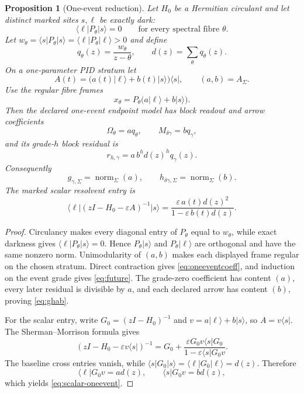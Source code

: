 \documentclass[11pt]{article}
\newtheorem{proposition}{Proposition}[section]
\theoremstyle{definition}
\theoremstyle{remark}
\newcommand{\eps}{\varepsilon}
\newcommand{\ket}[1]{\lvert #1\rangle}
\newcommand{\bra}[1]{\langle #1\rvert}
\begin{document}
\begin{proposition}[One-event reduction]\label{prop:oneevent}
Let $H_0$ be a Hermitian circulant and let distinct marked sites $s,\ell$ be exactly dark:
\[
\bra\ell P_\theta\ket s=0
\qquad\text{for every spectral fibre }\theta.
\]
Let $w_\theta=\bra sP_\theta\ket s=\bra\ell P_\theta\ket\ell>0$ and define
\[
q_\theta(z)=\frac{w_\theta}{z-\theta},
\qquad
d(z)=\sum_\theta q_\theta(z).
\]
On a one-parameter PID stratum let
\begin{equation}\label{eq:Aab}
A(t)=\bigl(a(t)\ket\ell+b(t)\ket s\bigr)\bra s,
\qquad (a,b)=A_\Sigma.
\end{equation}
Use the regular fibre frames
\[
x_\theta=P_\theta\bigl(a\ket\ell+b\ket s\bigr).
\]
Then the declared one-event endpoint model has block readout and arrow coefficients
\begin{equation}\label{eq:oneeventcoeff}
\Omega_\theta=a q_\theta,
\qquad
M_{\delta\gamma}=b q_\gamma,
\end{equation}
and its grade-$h$ block residual is
\begin{equation}\label{eq:future}
r_{h,\gamma}=a\,b^h d(z)^h q_\gamma(z).
\end{equation}
Consequently
\begin{equation}\label{eq:ghab}
g_{\gamma,\Sigma}=\operatorname{norm}_\Sigma(a),
\qquad
h_{\delta\gamma,\Sigma}=\operatorname{norm}_\Sigma(b).
\end{equation}
The marked scalar resolvent entry is
\begin{equation}\label{eq:scalar-oneevent}
\bra\ell(zI-H_0-\eps A)^{-1}\ket s
=
\frac{\eps\,a(t)d(z)^2}{1-\eps\,b(t)d(z)}.
\end{equation}
\end{proposition}

\begin{proof}
Circulancy makes every diagonal entry of $P_\theta$ equal to $w_\theta$, while exact darkness gives $\bra\ell P_\theta\ket s=0$. Hence $P_\theta\ket s$ and $P_\theta\ket\ell$ are orthogonal and have the same nonzero norm. Unimodularity of $(a,b)$ makes each displayed frame regular on the chosen stratum. Direct contraction gives \eqref{eq:oneeventcoeff}, and induction on the event grade gives \eqref{eq:future}. The grade-zero coefficient has content $(a)$, every later residual is divisible by $a$, and each declared arrow has content $(b)$, proving \eqref{eq:ghab}.

For the scalar entry, write $G_0=(zI-H_0)^{-1}$ and $v=a\ket\ell+b\ket s$, so $A=v\bra s$. The Sherman--Morrison formula \parencite{ShermanMorrison1950,Hager1989} gives
\[
(zI-H_0-\eps v\bra s)^{-1}
=G_0+\frac{\eps G_0v\bra sG_0}{1-\eps\bra sG_0v}.
\]
The baseline cross entries vanish, while $\bra sG_0\ket s=\bra\ell G_0\ket\ell=d(z)$. Therefore
\[
\bra\ell G_0v=a d(z),
\qquad
\bra sG_0v=b d(z),
\]
which yields \eqref{eq:scalar-oneevent}.
\end{proof}
\end{document}
